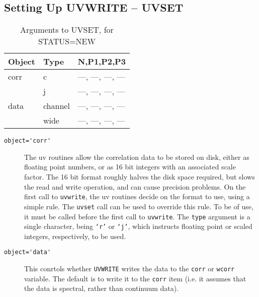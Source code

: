 \subsection{Setting Up UVWRITE -- UVSET}
\begin{table}\centering
\begin{tabular}{|l|l|l|}					   \hline
\bf Object	& \bf Type	& \bf N,P1,P2,P3		\\ \hline
 corr		& c		&  ---, ---, ---, ---		\\
		& j		&  ---, ---, ---, ---		\\
 data		& channel	&  ---, ---, ---, ---		\\
		& wide		&  ---, ---, ---, ---		\\ \hline
\end{tabular}
\caption{Arguments to UVSET, for STATUS=NEW}
\label{t:uvset-new}
\end{table}
\begin{description}
\item[\verb+object='corr'+]
The uv routines allow the correlation data to be stored on disk, either
as floating point numbers, or as 16 bit integers with an associated scale
factor. The 16 bit format roughly halves the disk space required, but slows
the read and write operation, and can cause precision problems. On the
first call to {\tt uvwrite}, the uv routines decide on the format to
use, using a simple rule. The {\tt uvset} call
can be used to override this rule. To be of use, it must be called before
the first call to {\tt uvwrite}. The {\tt type} argument is a single
character, being {\tt `r'} or {\tt `j'}, which instructs floating
point or scaled integers, respectively, to be used.
\item[\verb+object='data'+] This conrtols whether {\tt UVWRITE} writes the
data to the {\tt corr} or {\tt wcorr} variable. The default is to write it
to the {\tt corr} item (i.e. it assumes that the data is spectral, rather
than continuum data).
\end{description}

